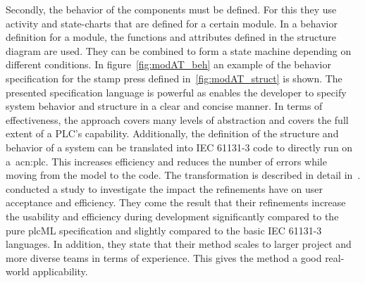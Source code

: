 Secondly, the behavior of the components must be defined.
For this they use activity and state-charts that are defined for a certain module.
In a behavior definition for a module, the functions and attributes defined in the structure diagram are used.
They can be combined to form a state machine depending on different conditions.
In figure~\ref{fig:modAT_beh} an example of the behavior specification for the stamp press defined in~\ref{fig:modAT_struct} is shown.
The presented specification language is powerful as enables the developer to specify system behavior and structure in a clear and concise manner.
In terms of effectiveness, the approach covers many levels of abstraction and covers the full extent of a PLC's capability.
Additionally, the definition of the structure and behavior of a system can be translated into IEC 61131-3 code to directly run on a~\acrshort{acn:plc}.
This increases efficiency and reduces the number of errors while moving from the model to the code.
The transformation is described in detail in~\cite{WITSCH2015}.
\citeauthor{Obermeier:2015aa} conducted a study to investigate the impact the refinements have on user acceptance and efficiency.
They come the result that their refinements increase the usability and efficiency during development significantly compared to the pure plcML specification and slightly compared to the basic IEC 61131-3 languages.
In addition, they state that their method scales to larger project and more diverse teams in terms of experience.
This gives the method a good real-world applicability.

